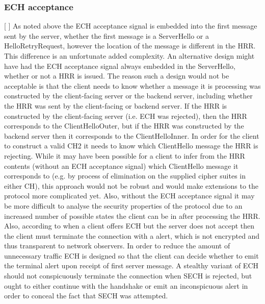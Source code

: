 \subsubsection{ECH acceptance}

[ ] As noted above the ECH acceptance signal is embedded into the first message sent by the server, whether the first message is a ServerHello or a HelloRetryRequest, however the location of the message is different in the HRR. This difference is an unfortunate added complexity. An alternative design might have had the ECH acceptance signal always embedded in the ServerHello, whether or not a HRR is issued. The reason such a design would not be acceptable is that the client needs to know whether a message it is processing was constructed by the client-facing server or the backend server, including whether the HRR was sent by the client-facing or backend server. If the HRR is constructed by the client-facing server (i.e. ECH was rejected), then the HRR corresponds to the ClientHelloOuter, but if the HRR was constructed by the backend server then it corresponds to the ClientHelloInner. In order for the client to construct a valid CH2 it needs to know which ClientHello message the HRR is rejecting.  While it may have been possible for a client to infer from the HRR contents (without an ECH acceptance signal) which ClientHello message it corresponds to (e.g. by process of elimination on the supplied cipher suites in either CH), this approach would not be robust and would make extensions to the protocol more complicated yet. Also, without the ECH acceptance signal it may be more difficult to analyse the security properties of the protocol due to an increased number of possible states the client can be in after processing the HRR.
Also, according to \cite{esni} when a client offers ECH but the server does not accept then the client must terminate the connection with a  alert, which is not encrypted and thus transparent to network observers. In order to reduce the amount of unnecessary traffic ECH is designed so that the client can decide whether to emit the terminal  alert upon receipt of first server message. A stealthy variant of ECH should not conspicuously terminate the connection when SECH is rejected, but ought to either continue with the handshake or emit an inconspicuous alert in order to conceal the fact that SECH was attempted.



